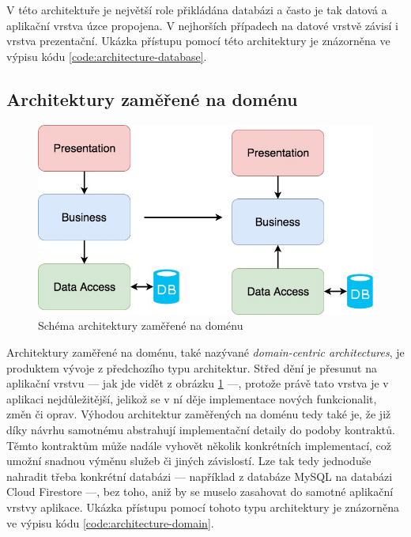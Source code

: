 V této architektuře je největší role přikládána databázi
a často je tak datová a aplikační vrstva úzce propojena.
V nejhorších případech na datové vrstvě závisí i vrstva prezentační.
\cite{architecture}
Ukázka přístupu pomocí této architektury je znázorněna ve výpisu kódu
\ref{code:architecture-database}.

\subsection{Architektury zaměřené na doménu}

\begin{figure}
    \centering
    \includegraphics[width=0.5\linewidth]{assets/technology-research/architecture/domain-centric.jpeg}
    \caption{Schéma architektury zaměřené na doménu  \cite{architecture}}
    \label{fig:architecture_domain}
\end{figure}

Architektury zaměřené na doménu,
také nazývané \emph{domain-centric architectures},
je produktem vývoje z předchozího typu architektur.
Střed dění je přesunut na aplikační vrstvu
--- jak jde vidět z obrázku \ref{fig:architecture_domain} ---,
protože právě tato vrstva je v aplikaci nejdůležitější,
jelikož se v ní děje implementace nových funkcionalit, změn či oprav.
\cite{architecture}
\cite{martin_clean_architecture}
Výhodou architektur zaměřených na doménu tedy také je,
že již díky návrhu samotnému abstrahují implementační detaily do podoby
kontraktů.
Těmto kontraktům může nadále vyhovět několik konkrétních implementací,
což umožní snadnou výměnu služeb či jiných závislostí.
\cite{martin_clean_architecture}
Lze tak tedy jednoduše nahradit třeba konkrétní databázi
--- například z databáze MySQL na databázi Cloud Firestore ---,
bez toho,
aniž by se muselo zasahovat do samotné aplikační vrstvy aplikace.
Ukázka přístupu pomocí tohoto typu architektury je znázorněna ve výpisu kódu
\ref{code:architecture-domain}.

